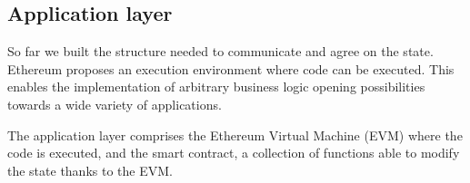 \subsection{Application layer}

So far we built the structure needed to communicate and agree on the state.
Ethereum proposes an execution environment where code can be executed. This
enables the implementation of arbitrary business logic opening possibilities
towards a wide variety of applications.

The application layer comprises the Ethereum Virtual Machine (EVM) where the
code is executed, and the smart contract, a collection of functions able to
modify the state thanks to the EVM.
